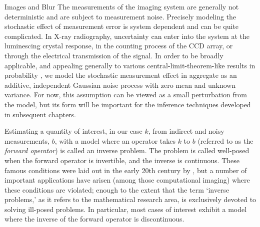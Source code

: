 \begin{chapter}{Images and Blur}
  The measurements of the imaging system are generally not deterministic and are subject to measurement noise.
  Precisely modeling the stochastic effect of measurement error is system dependent and can be quite complicated.
  In X-ray radiography, uncertainty can enter into the system at the luminescing crystal response, in the counting process of the CCD array, or through the electrical transmission of the signal.
  In order to be broadly applicable, and appealing generally to various central-limit-theorem-like results in probability \citep{durrett2010probability}, we model the stochastic measurement effect in aggregate as an additive, independent Gaussian noise process with zero mean and unknown variance.  
  For now, this assumption can be viewed as a small perturbation from the model, but its form will be important for the inference techniques developed in subsequent chapters.

  Estimating a quantity of interest, in our case $k$, from indirect and noisy measurements, $b$, with a model where an operator takes $k$ to $b$ (referred to as the \emph{forward operator}) is called an inverse problem.  
  The problem is called well-posed when the forward operator is invertible, and the inverse is continuous. %
  These famous conditions were laid out in the early 20th century by \citep{hadamard1902}, but a number of important applications have arisen (among those computational imaging) where these conditions are violated; enough to the extent that the term `inverse problems,' as it refers to the mathematical research area, is exclusively devoted to solving ill-posed problems.
  In particular, most cases of interest %
  exhibit a model where the inverse of the forward operator is discontinuous.


\end{chapter}
